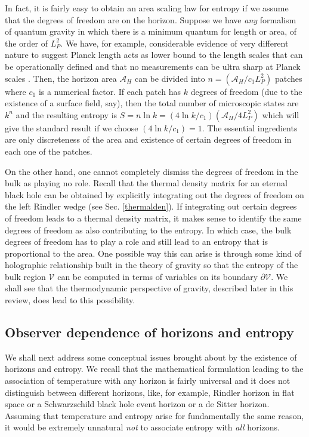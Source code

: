 \documentclass[12pt]{iopart}
\begin{document}
In fact, it is fairly easy to obtain an area scaling law for entropy if we assume that the degrees of freedom are on the horizon.  Suppose we have {\it any} formalism of quantum gravity in
which there is a minimum quantum for length or area, of the order of $L_P^2$. 
We have, for example,  considerable evidence of very different nature to suggest Planck length acts as lower bound to the length scales that can be operationally defined and that no measurements can be ultra sharp at Planck scales \cite{tplimitations}.
Then, the horizon area $\mathcal{A}_H$ 
can be divided into $n=(\mathcal{A}_H/c_1L_P^2)$ patches where $c_1$ is a numerical factor. If each patch has $k$ degrees of freedom
(due to the existence of a surface field, say), then the total number of microscopic states are $k^n$ and the resulting entropy is
$S=n\ln k=(4\ln k/c_1)(\mathcal{A}_H/4L_P^2)$ which will give the standard result if we choose $(4\ln k/c_1)=1$. The essential ingredients
are only discreteness of the area and existence of certain degrees of freedom in each one of the patches.   

On the other hand, one cannot completely dismiss the degrees of freedom in the bulk as playing no role. Recall that the thermal density matrix for an eternal black hole can be  obtained by explicitly integrating out the degrees of freedom on the left Rindler wedge (see Sec. \ref{thermalden}). If integrating out certain degrees of freedom leads to a thermal density matrix, it makes sense to identify the same degrees of freedom as also contributing to the entropy. In which case, the bulk degrees of freedom has to play a role and still lead to an entropy that is proportional to the area. 
 One possible way this can arise is through
 some kind of holographic relationship built in the theory of gravity so that the entropy of the bulk region $\mathcal{V}$ can be computed in terms of variables on its boundary $\partial\mathcal{V}$. We shall see that the thermodynamic perspective of  gravity,
described later in this review, does lead to this possibility.


\subsection{Observer dependence of horizons and entropy}\label{sec:obsdependence}

We shall next address some  conceptual issues brought about by the existence of horizons and entropy. We recall that the mathematical formulation leading to the association of temperature with any horizon is fairly universal and it does not distinguish between different horizons, like, for example, Rindler horizon in flat space or a Schwarzschild black hole event horizon or a de Sitter horizon. Assuming that temperature and entropy arise for fundamentally the same reason, it would be extremely unnatural \textit{not} to associate entropy with \textit{all} horizons. 
\end{document}
